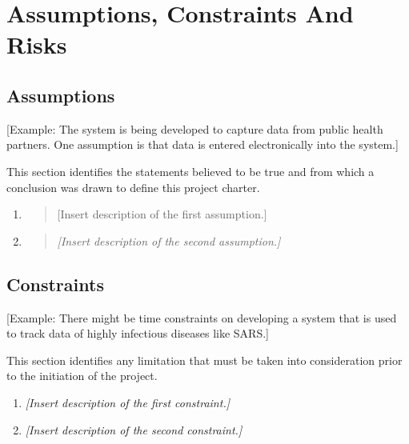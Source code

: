 \documentclass[a4paper, 11pt]{article}
\begin{document}
\hypertarget{assumptions-constraints-and-risks}{%
\section{Assumptions, Constraints And Risks}\label{assumptions-constraints-and-risks}}

\hypertarget{assumptions}{%
\subsection{Assumptions}\label{assumptions}}

{[}Example: The system is being developed to capture data from public
health partners. One assumption is that data is entered electronically
into the system.{]}

This section identifies the statements believed to be true and from
which a conclusion was drawn to define this project charter.

\begin{enumerate}
\def\labelenumi{\arabic{enumi}.}
\item
  \begin{quote}
  {[}Insert description of the first assumption.{]}
  \end{quote}
\item
  \begin{quote}
  \emph{{[}Insert description of the second assumption.{]}}
  \end{quote}
\end{enumerate}

\hypertarget{constraints}{%
\subsection{Constraints}\label{constraints}}

{[}Example: There might be time constraints on developing a system that
is used to track data of highly infectious diseases like SARS.{]}

This section identifies any limitation that must be taken into
consideration prior to the initiation of the project.

\begin{enumerate}
\def\labelenumi{\arabic{enumi}.}
\item
  \emph{{[}Insert description of the first constraint.{]}}
\item
  \emph{{[}Insert description of the second constraint.{]}}
\end{enumerate}
\end{document}
